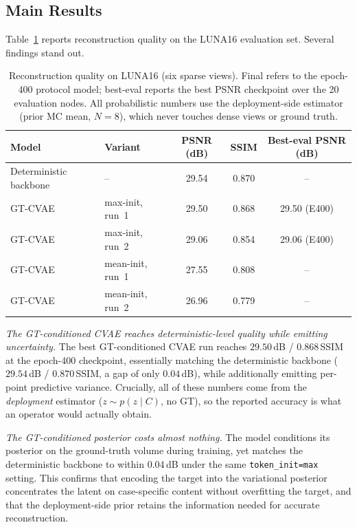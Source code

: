 \subsection{Main Results}
\label{sec:exp:main}

Table~\ref{tab:results} reports reconstruction quality on the LUNA16
evaluation set. Several findings stand out.

\begin{table}[t]
\centering
\small
\setlength{\tabcolsep}{4pt}
\caption{Reconstruction quality on LUNA16 (six sparse views). Final
refers to the epoch-400 protocol model; best-eval reports the best PSNR
checkpoint over the 20 evaluation nodes. All probabilistic numbers use
the deployment-side estimator (prior MC mean, $N{=}8$), which never
touches dense views or ground truth.}
\label{tab:results}
\begin{tabular}{@{}p{3.3cm}p{2.5cm}ccc@{}}
\toprule
Model & Variant & PSNR (dB) & SSIM & Best-eval PSNR (dB) \\
\midrule
Deterministic backbone \cite{lin2024difgaussian} & -- & 29.54 & 0.870 & -- \\
\midrule
GT-CVAE & max-init, run~1 & 29.50 & 0.868 & 29.50 (E400) \\
GT-CVAE & max-init, run~2 & 29.06 & 0.854 & 29.06 (E400) \\
GT-CVAE & mean-init, run~1 & 27.55 & 0.808 & -- \\
GT-CVAE & mean-init, run~2 & 26.96 & 0.779 & -- \\
\bottomrule
\end{tabular}
\end{table}

\emph{The GT-conditioned CVAE reaches deterministic-level quality while
emitting uncertainty.}
The best GT-conditioned CVAE run reaches $29.50$\,dB / $0.868$\,SSIM at
the epoch-400 checkpoint, essentially matching the deterministic
backbone ($29.54$\,dB / $0.870$\,SSIM, a gap of only
$0.04$\,dB), while additionally emitting per-point predictive variance. Crucially, all of these numbers come from the
\emph{deployment} estimator ($z\sim p(z\mid C)$, no GT), so the reported
accuracy is what an operator would actually obtain.

\emph{The GT-conditioned posterior costs almost nothing.}
The model conditions its posterior on the ground-truth volume during
training, yet matches the deterministic backbone to within $0.04$\,dB
under the same \texttt{token\_init=max} setting. This confirms that
encoding the target into the variational posterior concentrates the
latent on case-specific content without overfitting the target, and
that the deployment-side prior retains the information needed for
accurate reconstruction.

